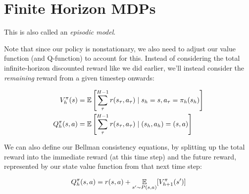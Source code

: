 \documentclass[../main/main]{subfiles}
\begin{document}
\section{Finite Horizon MDPs}





This is also called an \emph{episodic model}.



Note that since our policy is nonstationary, we also need to adjust our value
function (and Q-function) to account for this.
Instead of considering the total infinite-horizon discounted reward like we did
earlier,
we'll instead consider the \emph{remaining} reward from a given timestep
onwards:

\begin{align*}
    V^\pi_h(s) &= \operatorname*{\mathbb{E}} \left[ \sum_\tau^{H-1} r(s_\tau, a_\tau) \mid s_h = s, a_\tau = \pi_h(s_h) \right] \\
    Q^\pi_h(s, a) &= \operatorname*{\mathbb{E}} \left[ \sum_\tau^{H-1} r(s_\tau, a_\tau) \mid (s_h, a_h) = (s, a) \right]
\end{align*}


We can also define our Bellman consistency equations, by splitting up the total
reward into the immediate reward (at this time step) and the future reward,
represented by our state value function from that next time step:

\[
    Q^\pi_h(s, a) = r(s, a) + \operatorname*{\mathbb{E}}_{s' \sim P(s, a)}[V^\pi_{h+1}(s')]
\]
\end{document}
